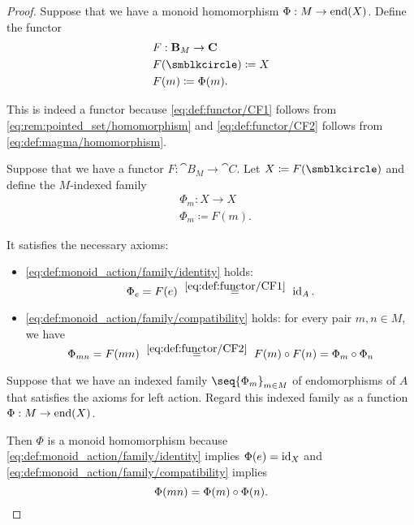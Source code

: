 \begin{proof}
   Suppose that we have a monoid homomorphism \( \Phi: M \to \operatorname{end}(X) \). Define the functor
  \begin{equation*}
    \begin{aligned}
      &F: \cat{B}_M \to \cat{C} \\
      &F(\anon) \coloneqq X \\
      &F(m) \coloneqq \Phi(m).
    \end{aligned}
  \end{equation*}

  This is indeed a functor because \eqref{eq:def:functor/CF1} follows from \eqref{eq:rem:pointed_set/homomorphism} and \eqref{eq:def:functor/CF2} follows from \eqref{eq:def:magma/homomorphism}.

   Suppose that we have a functor \( F: \cat{B}_M \to \cat{C} \). Let \( X \coloneqq F(\anon) \) and define the \( M \)-indexed family
  \begin{equation*}
    \begin{aligned}
      &\Phi_m: X \to X \\
      &\Phi_m \coloneqq F(m).
    \end{aligned}
  \end{equation*}

  It satisfies the necessary axioms:
  \begin{itemize}
    \item \ref{eq:def:monoid_action/family/identity} holds:
    \begin{equation*}
      \Phi_e
      =
      F(e)
      \reloset {\eqref{eq:def:functor/CF1}} =
      \id_A.
    \end{equation*}

    \item \ref{eq:def:monoid_action/family/compatibility} holds: for every pair \( m, n \in M \), we have
    \begin{equation*}
      \Phi_{mn}
      =
      F(mn)
      \reloset {\eqref{eq:def:functor/CF2}} =
      F(m) \bincirc F(n)
      =
      \Phi_m \bincirc \Phi_n
    \end{equation*}
  \end{itemize}

   Suppose that we have an indexed family \( \seq{ \Phi_m }_{m \in M} \) of endomorphisms of \( A \) that satisfies the axioms for left action. Regard this indexed family as a function \( \Phi: M \to \operatorname{end}(X) \).

  Then \( \Phi \) is a monoid homomorphism because \ref{eq:def:monoid_action/family/identity} implies \( \Phi(e) = \operatorname{id}_X \) and \eqref{eq:def:monoid_action/family/compatibility} implies
  \begin{equation*}
    \Phi(mn) = \Phi(m) \bincirc \Phi(n).
  \end{equation*}
\end{proof}

